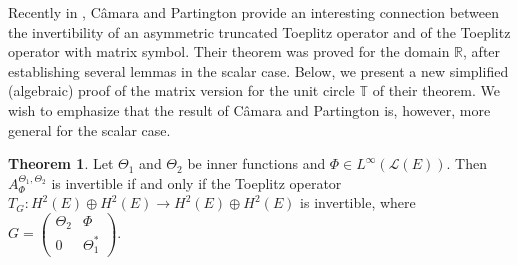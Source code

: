 \documentclass{amsart}
\theoremstyle{definition}
\newtheorem{thm}{Theorem}[section]
\newcommand{\oL }{\mathcal{L}(E) }
\begin{document}
\medskip
Recently in \cite[Theorem 5.6]{part3}, C\^{a}mara and Partington provide %
 an interesting connection  between the invertibility of an asymmetric truncated Toeplitz operator and of  the Toeplitz operator with matrix symbol. Their theorem was proved for the domain $\mathbb{R}$, after establishing several lemmas in the scalar case. Below, we present a new %
 simplified (algebraic) proof of the matrix version for the unit circle $\mathbb{T}$ of their theorem. 
 We wish to emphasize that the result of C\^{a}mara and Partington is, however, more general for the scalar case.

\medskip

\begin{thm}\label{G} Let $\Theta_1$ and $\Theta_2$ be inner functions and 
 $\Phi\in L^{\infty}(\oL)$. Then $A_{\Phi}^{\Theta_{1},\Theta_{2}}$ is invertible if and only if the Toeplitz operator $T_{G}: H^2(E)\oplus H^2(E)\to H^2(E)\oplus H^2(E)$ is invertible,
where $G=\begin{pmatrix}
\Theta_{2}& \Phi\\
0&\Theta_{1}^{*}
\end{pmatrix}.
$
\end{thm}
\end{document}
